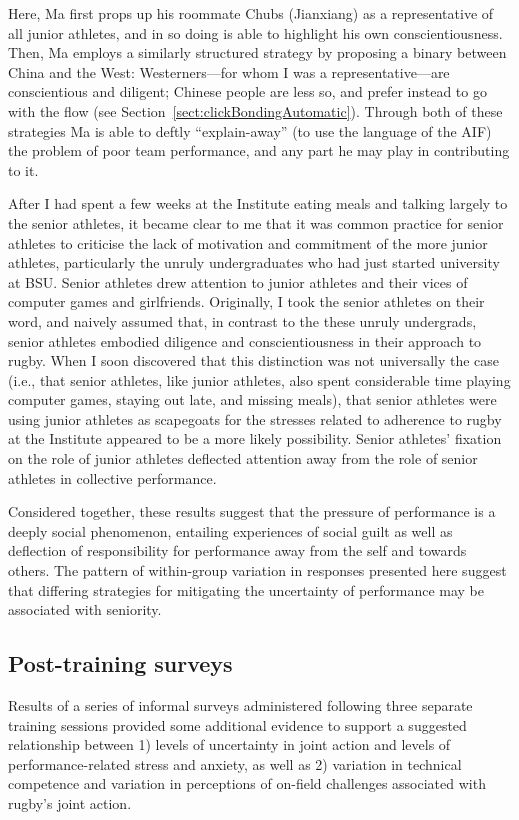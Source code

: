 \begin{CJK}{UTF8}{gbsn}
Here, Ma first props up his roommate Chubs (Jianxiang) as a representative of all junior athletes, and in so doing is able to highlight his own conscientiousness.  Then, Ma employs a similarly structured strategy by proposing a binary between China and the West: Westerners---for whom I was a representative---are conscientious and diligent; Chinese people are less so, and prefer instead to go with the flow (see Section~\ref{sect:clickBondingAutomatic}).  Through both of these strategies Ma is able to deftly ``explain-away'' (to use the language of the AIF) the problem of poor team performance, and any part he may play in contributing to it.

After I had spent a few weeks at the Institute eating meals and talking largely to the senior athletes, it became clear to me that it was common practice for senior athletes to criticise the lack of motivation and commitment of the more junior athletes, particularly the unruly undergraduates who had just started university at BSU.  Senior athletes drew attention to junior athletes and their vices of computer games and girlfriends.  Originally, I took the senior athletes on their word, and naively assumed that, in contrast to the these unruly undergrads, senior athletes embodied diligence and conscientiousness in their approach to rugby.  When I soon discovered that this distinction was not universally the case (i.e., that senior athletes, like junior athletes, also spent considerable time playing computer games, staying out late, and missing meals), that senior athletes were using junior athletes as scapegoats for the stresses related to adherence to rugby at the Institute appeared to be a more likely possibility.  Senior athletes' fixation on the role of junior athletes deflected attention away from the role of senior athletes in collective performance.

Considered together, these results suggest that the pressure of performance is a deeply social phenomenon, entailing experiences of social guilt as well as deflection of responsibility for performance away from the self and towards others.  The pattern of within-group variation in responses presented here suggest that differing strategies for mitigating the uncertainty of performance may be associated with seniority.



\subsection{Post-training surveys\label{sect:postTrainingSurvey}}
Results of a series of informal surveys administered following three separate training sessions provided some additional evidence to support a suggested relationship between 1) levels of uncertainty in joint action and levels of performance-related stress and anxiety, as well as 2) variation in technical competence and variation in perceptions of on-field challenges associated with rugby's joint action.


\end{CJK}
